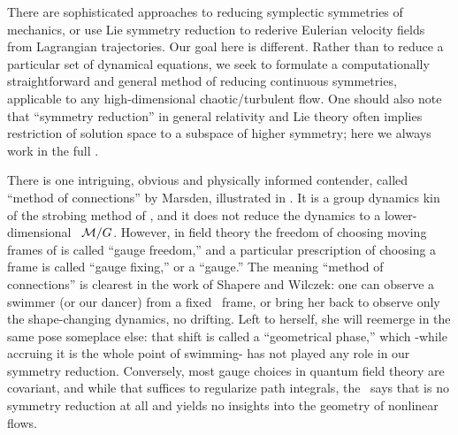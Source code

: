 \documentclass[aip,cha,reprint,
secnumarabic,
nofootinbib, tightenlines,
nobibnotes, showkeys, showpacs,
groupedaddress
]{revtex4-1}
\begin{document}

There are sophisticated approaches to reducing symplectic symmetries of
mechanics, or use Lie symmetry reduction to rederive Eulerian
velocity fields from Lagrangian trajectories. Our goal
here is different. Rather than to reduce a particular set of dynamical
equations, we seek to formulate a computationally straightforward and general
method of reducing continuous symmetries, applicable to any
high-dimensional chaotic/turbulent flow. One should also note that
``symmetry reduction'' in general relativity and Lie theory often implies
restriction of solution space to a subspace of higher symmetry; here we
always work in the full \statesp.

There is one intriguing, obvious and physically informed contender,
called ``method of connections'' by
Marsden, illustrated in . It is a group dynamics kin of the strobing
method of , and it does not reduce the dynamics to a
lower-dimensional \reducedsp\ ${\cal M}/G$. However, in field theory the
freedom of choosing moving frames of  is called
``gauge freedom,'' and a particular prescription of choosing a frame is
called ``gauge fixing,'' or a ``gauge.'' The meaning ``method of
connections'' is clearest in the work of Shapere and
Wilczek: one can observe a swimmer (or our dancer) from
a fixed \slice\ frame, or bring her back to observe only the
shape-changing dynamics, no drifting. Left to herself, she will reemerge
in the same pose someplace else: that shift is called a ``geometrical
phase,'' which -while accruing it is the whole point of swimming- has not
played any role in our symmetry reduction. Conversely, most gauge choices
in quantum field theory are covariant, and while that suffices to
regularize path integrals, the \mslices\ says that is no symmetry
reduction at all and yields no insights into the geometry of nonlinear flows.
\end{document}
